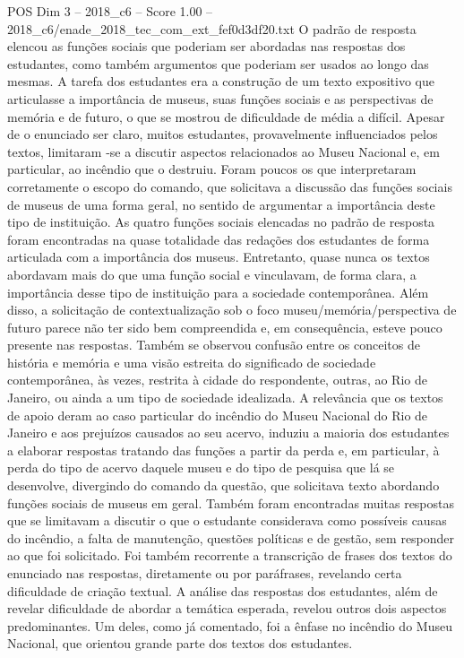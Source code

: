 \begin{textsample}{POS Dim 3 – 2018\_c6 – Score 1.00 – 2018\_c6/enade\_2018\_tec\_com\_ext\_fef0d3df20.txt}
O padrão de resposta elencou as funções sociais que poderiam ser abordadas nas respostas dos estudantes, como também argumentos que poderiam ser usados ao longo das mesmas.
A tarefa dos estudantes era a construção de um texto expositivo que articulasse a importância de museus, suas funções sociais e as perspectivas de memória e de futuro, o que se mostrou de dificuldade de média a difícil.
Apesar de o enunciado ser claro, muitos estudantes, provavelmente influenciados pelos textos, limitaram -se a discutir aspectos relacionados ao Museu Nacional e, em particular, ao incêndio que o destruiu.
Foram poucos os que interpretaram corretamente o escopo do comando, que solicitava a discussão das funções sociais de museus de uma forma geral, no sentido de argumentar a importância deste tipo de instituição.
As quatro funções sociais elencadas no padrão de resposta foram encontradas na quase totalidade das redações dos estudantes de forma articulada com a importância dos museus.
Entretanto, quase nunca os textos abordavam mais do que uma função social e vinculavam, de forma clara, a importância desse tipo de instituição para a sociedade contemporânea.
Além disso, a solicitação de contextualização sob o foco museu/memória/perspectiva de futuro parece não ter sido bem compreendida e, em consequência, esteve pouco presente nas respostas.
Também se observou confusão entre os conceitos de história e memória e uma visão estreita do significado de sociedade contemporânea, às vezes, restrita à cidade do respondente, outras, ao Rio de Janeiro, ou ainda a um tipo de sociedade idealizada.
A relevância que os textos de apoio deram ao caso particular do incêndio do Museu Nacional do Rio de Janeiro e aos prejuízos causados ao seu acervo, induziu a maioria dos estudantes a elaborar respostas tratando das funções a partir da perda e, em particular, à perda do tipo de acervo daquele museu e do tipo de pesquisa que lá se desenvolve, divergindo do comando da questão, que solicitava texto abordando funções sociais de museus em geral.
Também foram encontradas muitas respostas que se limitavam a discutir o que o estudante considerava como possíveis causas do incêndio, a falta de manutenção, questões políticas e de gestão, sem responder ao que foi solicitado.
Foi também recorrente a transcrição de frases dos textos do enunciado nas respostas, diretamente ou por paráfrases, revelando certa dificuldade de criação textual.
A análise das respostas dos estudantes, além de revelar dificuldade de abordar a temática esperada, revelou outros dois aspectos predominantes.
Um deles, como já comentado, foi a ênfase no incêndio do Museu Nacional, que orientou grande parte dos textos dos estudantes.

\end{textsample}
